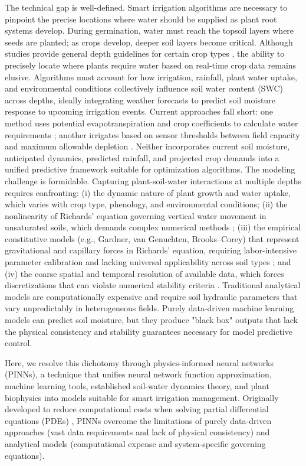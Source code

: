 \documentclass[pdflatex,sn-nature]{sn-jnl}%
\theoremstyle{thmstyleone}%
\theoremstyle{thmstyletwo}%
\theoremstyle{thmstylethree}%
\begin{document}
The technical gap is well-defined. Smart irrigation algorithms are necessary to pinpoint the precise locations where water should be supplied as plant root systems develop. During germination, water must reach the topsoil layers where seeds are planted; as crops develop, deeper soil layers become critical. Although studies provide general depth guidelines for certain crop types \cite{ASABE2021}, the ability to precisely locate where plants require water based on real-time crop data remains elusive. Algorithms must account for how irrigation, rainfall, plant water uptake, and environmental conditions collectively influence soil water content (SWC) across depths, ideally integrating weather forecasts to predict soil moisture response to upcoming irrigation events. Current approaches fall short: one method uses potential evapotranspiration and crop coefficients to calculate water requirements \cite{Volk2024}; another irrigates based on sensor thresholds between field capacity and maximum allowable depletion \cite{zhang2021}. Neither incorporates current soil moisture, anticipated dynamics, predicted rainfall, and projected crop demands into a unified predictive framework suitable for optimization algorithms.
The modeling challenge is formidable. Capturing plant-soil-water interactions at multiple depths requires confronting: (i) the dynamic nature of plant growth and water uptake, which varies with crop type, phenology, and environmental conditions; (ii) the nonlinearity of Richards' equation governing vertical water movement in unsaturated soils, which demands complex numerical methods \cite{Celia1990}; (iii) the empirical constitutive models (e.g., Gardner, van Genuchten, Brooks–Corey) that represent gravitational and capillary forces in Richards' equation, requiring labor-intensive parameter calibration and lacking universal applicability across soil types \cite{Pan2019}; and (iv) the coarse spatial and temporal resolution of available data, which forces discretizations that can violate numerical stability criteria \cite{Celia1990,leveque2007}. Traditional analytical models are computationally expensive and require soil hydraulic parameters that vary unpredictably in heterogeneous fields. Purely data-driven machine learning models can predict soil moisture, but they produce "black box" outputs that lack the physical consistency and stability guarantees necessary for model predictive control.

Here, we resolve this dichotomy through physics-informed neural networks (PINNs), a technique that unifies neural network function approximation, machine learning tools, established soil-water dynamics theory, and plant biophysics into models suitable for smart irrigation management. Originally developed to reduce computational costs when solving partial differential equations (PDEs) \cite{Cuomo2022}, PINNs overcome the limitations of purely data-driven approaches (vast data requirements and lack of physical consistency) and analytical models (computational expense and system-specific governing equations). 
\end{document}

